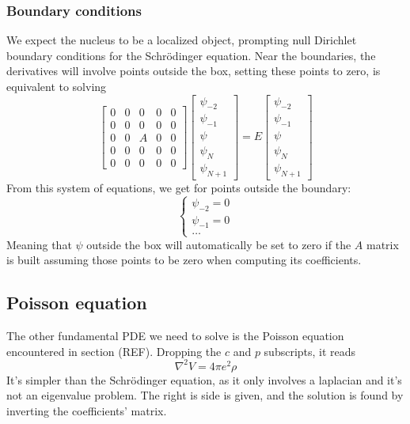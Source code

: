 \subsubsection{Boundary conditions}
We expect the nucleus to be a localized object, prompting null Dirichlet boundary conditions for the Schr\"odinger equation.
Near the boundaries, the derivatives will involve points outside the box, setting these points to zero, is equivalent to solving 
\begin{equation}
    \begin{bmatrix}
        0 & 0 & 0 & 0 & 0
        \\0 & 0 & 0 & 0 & 0
        \\0 & 0 & A & 0 & 0
        \\0 & 0 & 0 & 0 & 0
        \\0 & 0 & 0 & 0 & 0
    \end{bmatrix}
    \begin{bmatrix}
        \psi_{-2}\\\psi_{-1}\\\psi\\\psi_{N}\\ \psi_{N+1} 
    \end{bmatrix}
    = E 
    \begin{bmatrix}
        \psi_{-2}\\\psi_{-1}\\\psi\\\psi_{N}\\ \psi_{N+1} 
    \end{bmatrix}
\end{equation}
From this system of equations, we get for points outside the boundary:
\begin{equation}
    \begin{cases}
        \psi_{-2} = 0\\
        \psi_{-1} = 0\\
        \ldots
    \end{cases}
\end{equation}
Meaning that $\psi$ outside the box will automatically be set to zero if the $A$ matrix is built assuming those points to be zero when computing its coefficients.
\subsection{Poisson equation}
\label{subsec:poisson}
The other fundamental PDE we need to solve is the Poisson equation encountered in section (REF). Dropping the $c$ and $p$ subscripts, it reads
\begin{equation*}
\nabla^2 V = 4\pi e^2 \rho
\end{equation*}
It's simpler than the Schr\"odinger equation, as it only involves a laplacian and it's not an eigenvalue problem. The right is side is given, and the solution is found by inverting the coefficients' matrix.

